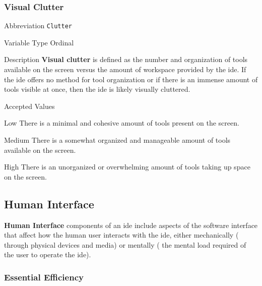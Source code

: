 \subsubsection{Visual Clutter}
\label{subsubsec:clutter}

\begin{AlignedDesc}
  \item[Abbreviation] \texttt{Clutter}

  \item[Variable Type] Ordinal

  \item[Description] \textbf{Visual clutter} is defined as the number
  and organization of tools available on the screen versus the amount of
  workspace provided by the \ac{ide}. If the \ac{ide} offers no method for
  tool organization or if there is an immense amount of tools visible at
  once, then the \ac{ide} is likely visually cluttered.

  \item[Accepted Values]

  \begin{AlignedDesc}
    \item[Low] There is a minimal and cohesive amount of tools present on
      the screen.
    \item[Medium] There is a somewhat organized and manageable amount of
    tools available on the screen.
    \item[High] There is an unorganized or overwhelming amount of tools
    taking up space on the screen.
  \end{AlignedDesc}

\end{AlignedDesc}


\subsection{Human Interface}
\label{subsec:humaninterface}

\textbf{Human Interface} components of an \ac{ide} include aspects of the
software interface that affect how the human user interacts with the \ac{ide},
either mechanically (\eg{} through physical devices and media) or
mentally (\eg{} the mental load required of the user to operate the
\ac{ide}).

\subsubsection{Essential Efficiency}
\label{subsubsec:eefficiency}

